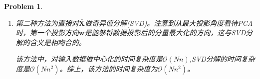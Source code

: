 \documentclass[UTF8]{article}
\newtheorem{hw}{Problem}
\newenvironment{sol}
\newcommand{\Smat}[0]{{{\boldsymbol S}}}
\newcommand{\Xmat}{{\boldsymbol X}}
\newcommand{\wv}{\boldsymbol{w}}
\begin{document}
\begin{hw}
\begin{sol}
\begin{enumerate}
{			

			该方法中，对输入数据做中心化的时间复杂度是$\mathcal{O}(Nn)$，求解$\Smat$的时间复杂度是$\mathcal{O}(Nn^2)$，之后对$n\times n$的矩阵$\Smat$做特征值分解的时间复杂度是$\mathcal{O}(n^3)$。综上，该方法的时间复杂度为$\mathcal{O}(Nn^2)$。

		}

		\item[(2)]{

			第二种方法为直接对$\bar{\Xmat}$做奇异值分解(SVD)。注意到从最大投影角度看待PCA时，第一个投影方向$\wv$是能够将数据投影后的分量最大化的方向，这与SVD分解的含义是相吻合的。

			

			该方法中，对输入数据做中心化的时间复杂度是$\mathcal{O}(Nn)$,SVD分解的时间复杂度是$\mathcal{O}(Nn^2)$。综上，该方法的时间复杂度为$\mathcal{O}(Nn^2)$。

		}

	\end{enumerate}

\end{sol}

\end{hw}
\end{document}
